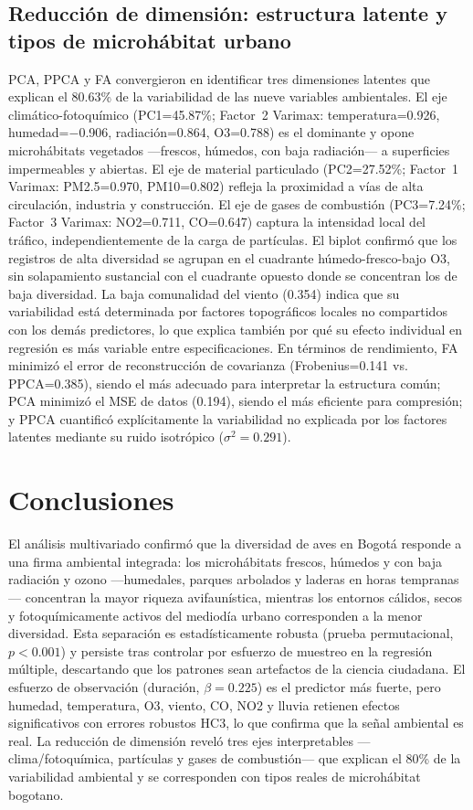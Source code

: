 \documentclass[9pt,letterpaper]{article}
\begin{document}
\subsection{Reducción de dimensión: estructura latente y tipos de microhábitat urbano}

PCA, PPCA y FA convergieron en identificar tres dimensiones latentes que explican el 80.63\% de la variabilidad de las nueve variables ambientales. El eje climático-fotoquímico (PC1=45.87\%; Factor~2 Varimax: temperatura=0.926, humedad=$-$0.906, radiación=0.864, O3=0.788) es el dominante y opone microhábitats vegetados ---frescos, húmedos, con baja radiación--- a superficies impermeables y abiertas. El eje de material particulado (PC2=27.52\%; Factor~1 Varimax: PM2.5=0.970, PM10=0.802) refleja la proximidad a vías de alta circulación, industria y construcción. El eje de gases de combustión (PC3=7.24\%; Factor~3 Varimax: NO2=0.711, CO=0.647) captura la intensidad local del tráfico, independientemente de la carga de partículas. El biplot confirmó que los registros de alta diversidad se agrupan en el cuadrante húmedo-fresco-bajo O3, sin solapamiento sustancial con el cuadrante opuesto donde se concentran los de baja diversidad. La baja comunalidad del viento (0.354) indica que su variabilidad está determinada por factores topográficos locales no compartidos con los demás predictores, lo que explica también por qué su efecto individual en regresión es más variable entre especificaciones. En términos de rendimiento, FA minimizó el error de reconstrucción de covarianza (Frobenius=0.141 vs. PPCA=0.385), siendo el más adecuado para interpretar la estructura común; PCA minimizó el MSE de datos (0.194), siendo el más eficiente para compresión; y PPCA cuantificó explícitamente la variabilidad no explicada por los factores latentes mediante su ruido isotrópico ($\sigma^2=0.291$).

\section{Conclusiones}

El análisis multivariado confirmó que la diversidad de aves en Bogotá responde a una firma ambiental integrada: los microhábitats frescos, húmedos y con baja radiación y ozono ---humedales, parques arbolados y laderas en horas tempranas--- concentran la mayor riqueza avifaunística, mientras los entornos cálidos, secos y fotoquímicamente activos del mediodía urbano corresponden a la menor diversidad. Esta separación es estadísticamente robusta (prueba permutacional, $p<0.001$) y persiste tras controlar por esfuerzo de muestreo en la regresión múltiple, descartando que los patrones sean artefactos de la ciencia ciudadana. El esfuerzo de observación (duración, $\beta=0.225$) es el predictor más fuerte, pero humedad, temperatura, O3, viento, CO, NO2 y lluvia retienen efectos significativos con errores robustos HC3, lo que confirma que la señal ambiental es real. La reducción de dimensión reveló tres ejes interpretables ---clima/fotoquímica, partículas y gases de combustión--- que explican el 80\% de la variabilidad ambiental y se corresponden con tipos reales de microhábitat bogotano.
\end{document}
